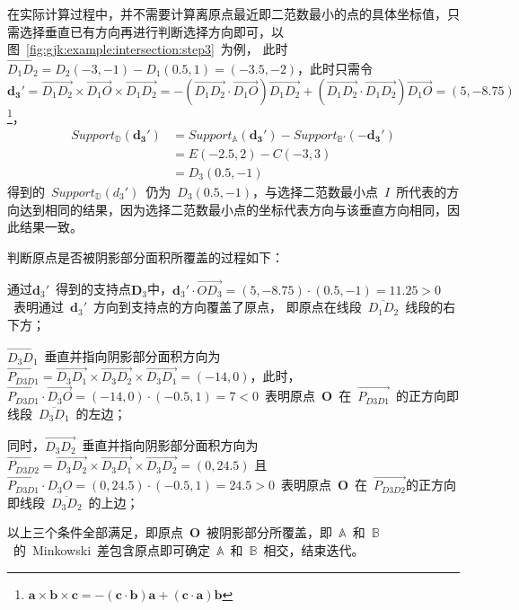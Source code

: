 在实际计算过程中，并不需要计算离原点最近即二范数最小的点的具体坐标值，只需选择垂直已有方向再进行判断选择方向即可，以图~\ref{fig:gjk:example:intersection:step3}~为例，
此时~$\overrightarrow{D_1D_2} = D_2(-3, -1) - D_1(0.5, 1) = (-3.5, -2)$，此时只需令~
$\bm{d_3'} = \overrightarrow{D_1D_2} \times \overrightarrow{D_1O} \times \overrightarrow{D_1D_2} = -(\overrightarrow{D_1D_2} \cdot \overrightarrow{D_1O})\overrightarrow{D_1D_2} +
(\overrightarrow{D_1D_2} \cdot \overrightarrow{D_1D_2})\overrightarrow{D_1O} = (5,-8.75)$
\footnote{$\bm{a} \times \bm{b} \times \bm{c} = -(\bm{c}\cdot\bm{b})\bm{a}+(\bm{c}\cdot\bm{a})\bm{b}$}，
\begin{equation}
  \begin{array}{ll}
  Support_\mathbb{D}(\bm{d_3'})  & = Support_\mathbb{A}(\bm{d_3'}) - Support_\mathbb{B'}(-\bm{d_3'}) \\
    & = E(-2.5, 2) - C(-3, 3) \\
    & = D_3(0.5, -1) 
  \end{array}
\end{equation}
得到的~$Support_\mathbb{D}(d_3')$~仍为~$D_3(0.5,-1)$，与选择二范数最小点~$I$~所代表的方向达到相同的结果，因为选择二范数最小点的坐标代表方向与该垂直方向相同，因此结果一致。

判断原点是否被阴影部分面积所覆盖的过程如下：\\ \indent
\begin{inparaenum}[(1)]
  \item 通过$\bm{d}_3'$~得到的支持点$\bm{D}_3$中，$\bm{d}_3' \cdot \overrightarrow{OD_3} = (5, -8.75) \cdot (0.5, -1) = 11.25 > 0$~表明通过~$\bm{d}_3'$~方向到支持点的方向覆盖了原点，
    即原点在线段~$\overline{D_1D_2}$~线段的右下方；\\ \indent
  \item $\overrightarrow{D_3D_1}$~垂直并指向阴影部分面积方向为~$\overrightarrow{P_{D3D1}}=\overrightarrow{D_3D_1} \times \overrightarrow{D_3D_2} \times \overrightarrow{D_3D_1} = (-14, 0)$，此时，
    $\overrightarrow{P_{D3D1}} \cdot \overrightarrow{D_3O} = (-14, 0) \cdot (-0.5, 1) = 7 < 0$~表明原点~$\bm{O}$~在~$\overrightarrow{P_{D3D1}}$~的正方向即线段~$\overline{D_3D_1}$~的左边；\\ \indent
  \item 同时，$\overrightarrow{D_3D_2}$~垂直并指向阴影部分面积方向为~$\overrightarrow{P_{D3D2}}=\overrightarrow{D_3D_2}
\times \overrightarrow{D_3D_1} \times \overrightarrow{D_3D_2} = (0, 24.5)$
且~$\overrightarrow{P_{D3D1}} \cdot D_3O = (0, 24.5) \cdot (-0.5, 1) = 24.5 > 0$~表明原点~$\bm{O}$~在~$\overrightarrow{P_{D3D2}}$的正方向即线段~$\overline{D_3D_2}$~的上边；\\ \indent
\end{inparaenum}
以上三个条件全部满足，即原点~$\bm{O}$~被阴影部分所覆盖，即~$\mathbb{A}$~和~$\mathbb{B}$~的~Minkowski~差包含原点即可确定~$\mathbb{A}$~和~$\mathbb{B}$~相交，结束迭代。

